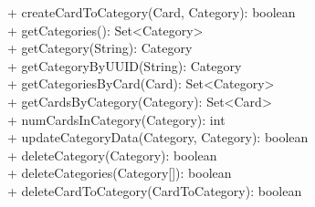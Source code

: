 {
    + createCardToCategory(Card, Category): boolean \\
    + getCategories(): Set<Category> \\
    + getCategory(String): Category \\
    + getCategoryByUUID(String): Category \\
    + getCategoriesByCard(Card): Set<Category> \\
    + getCardsByCategory(Category): Set<Card> \\
    + numCardsInCategory(Category): int \\
    + updateCategoryData(Category, Category): boolean \\
    + deleteCategory(Category): boolean \\
    + deleteCategories(Category[]): boolean \\
    + deleteCardToCategory(CardToCategory): boolean \\
}{} 